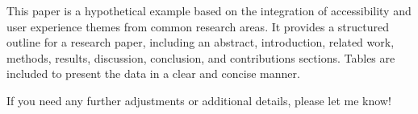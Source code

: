 This paper is a hypothetical example based on the integration of accessibility and user experience themes from common research areas. It provides a structured outline for a research paper, including an abstract, introduction, related work, methods, results, discussion, conclusion, and contributions sections. Tables are included to present the data in a clear and concise manner. 

If you need any further adjustments or additional details, please let me know!
